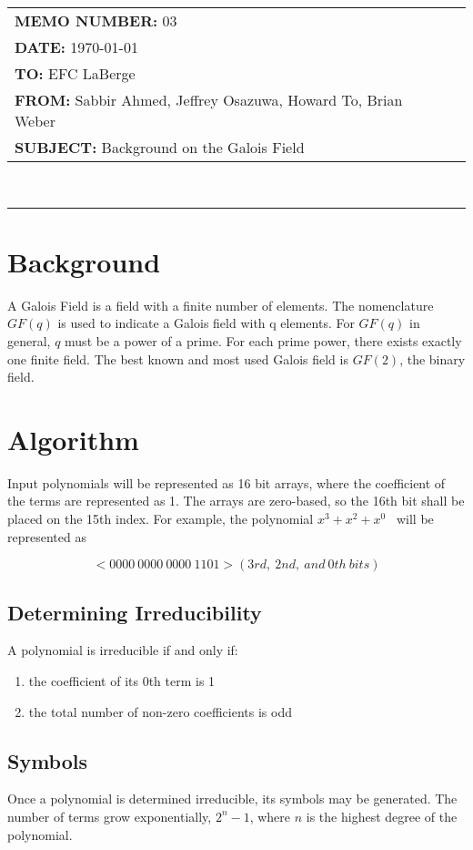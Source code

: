 \documentclass[paper=usletter, fontsize=12pt]{article}
\newcommand{\Sabbir}{Sabbir Ahmed}
\newcommand{\Jeffrey}{Jeffrey Osazuwa}
\newcommand{\Howard}{Howard To}
\newcommand{\Brian}{Brian Weber}
\newcommand{\polynomial}{$x^{3}+x^{2}+x^{0}$}
\newcommand{\documentinfo}[5]{
    \begin{centering}
        \parbox{2in}{
        \begin{spacing}{1}
            \begin{flushleft}
                \begin{tabular}{l l}
                    #1 \\
                    #2 \\
                    #3 \\
                    #4 \\
                    #5 \\
                \end{tabular}\\
                \rule{\textwidth}{1pt}
            \end{flushleft}
        \end{spacing}
        }
    \end{centering}
}
\begin{document}
     \documentinfo{\textbf{MEMO NUMBER:} 03}{\textbf{DATE:} \today}{\textbf{TO: } EFC LaBerge}{\textbf{FROM: }\Sabbir, \Jeffrey, \Howard, \Brian}{\textbf{SUBJECT: } Background on the Galois Field}
    \vspace{-0.1in}

    \section{Background}
    A Galois Field is a field with a finite number of elements. The nomenclature $GF(q)$ is used to indicate a Galois field with q elements. For $GF(q)$ in general, $q$ must be a power of a prime. For each prime power, there exists exactly one finite field. The best known and most used Galois field is $GF(2)$, the binary field.

    \section{Algorithm}
    Input polynomials will be represented as 16 bit arrays, where the coefficient of the terms are represented as 1. The arrays are zero-based, so the 16th bit shall be placed on the 15th index. For example, the polynomial \polynomial~ will be represented as

        \[ <0000 \ 0000 \ 0000 \ 1101> (3rd, \ 2nd, \ and \ 0th \ bits) \]

        \subsection{Determining Irreducibility}
        A polynomial is irreducible if and only if:
        \begin{enumerate}
            \item the coefficient of its 0th term is 1
            \item the total number of non-zero coefficients is odd
        \end{enumerate}

        \subsection{Symbols}

            Once a polynomial is determined irreducible, its symbols may be generated. The number of terms grow exponentially, $2^{n}-1$, where $n$ is the highest degree of the polynomial.
\end{document}
